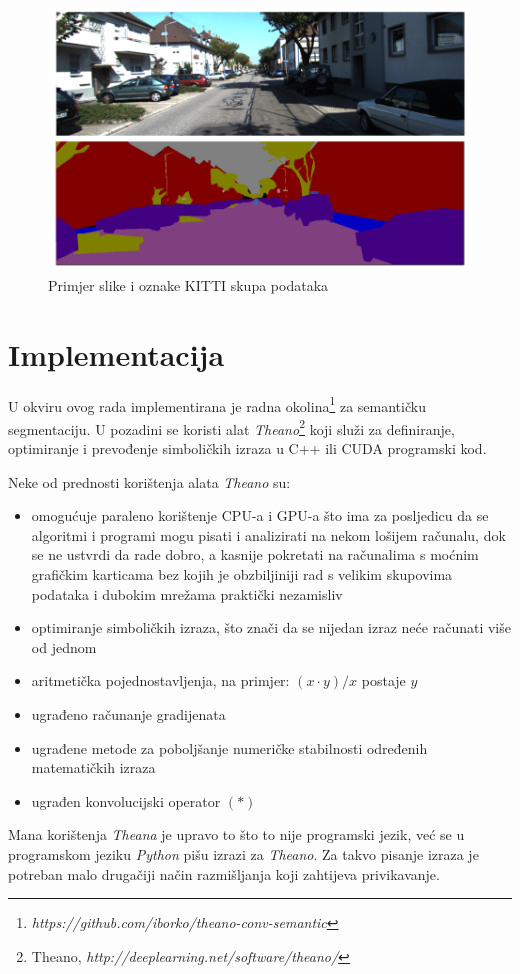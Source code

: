 \documentclass[times, utf8, diplomski, numeric]{fer}
\begin{document}
\begin{figure}[htb]
\centering
\includegraphics[width=\textwidth]{imgs/kitti-example.png}
\caption{Primjer slike i oznake KITTI skupa podataka}
\label{fig:kitti_example}
\end{figure}

\chapter{Implementacija}

U okviru ovog rada implementirana je radna okolina\footnote{\emph{https://github.com/iborko/theano-conv-semantic}}  za semantičku segmentaciju. U pozadini se koristi alat \textit{Theano}\footnote{Theano, \emph{http://deeplearning.net/software/theano/}} \cite{Theano-2012} \cite{Theano-2010} koji služi za definiranje, optimiranje i prevođenje simboličkih izraza u C++ ili CUDA programski kod.

Neke od prednosti korištenja alata \textit{Theano} su:
\begin{itemize}
	\item omogućuje paraleno korištenje CPU-a i GPU-a što ima za posljedicu da se algoritmi i programi mogu pisati i analizirati na nekom lošijem računalu, dok se ne ustvrdi da rade dobro, a kasnije pokretati na računalima s moćnim grafičkim karticama bez kojih je obzbiljiniji rad s velikim skupovima podataka i dubokim mrežama praktički nezamisliv
    \item optimiranje simboličkih izraza, što znači da se nijedan izraz neće računati više od jednom
    \item aritmetička pojednostavljenja, na primjer: $(x \cdot y)/x$ postaje $y$
    \item ugrađeno računanje gradijenata
    \item ugrađene metode za poboljšanje numeričke stabilnosti određenih matematičkih izraza
    \item ugrađen konvolucijski operator $\left( * \right)$
\end{itemize}
Mana korištenja \textit{Theana} je upravo to što to nije programski jezik, već se u programskom jeziku \textit{Python} pišu izrazi za \textit{Theano}. Za takvo pisanje izraza je potreban malo drugačiji način razmišljanja koji zahtijeva privikavanje.
\end{document}
